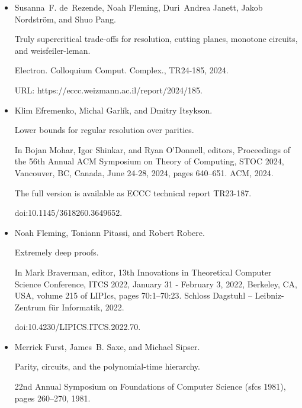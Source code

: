 \documentclass[10pt,a4paper]{article}
\begin{document}
\begin{itemize}
doi:10.2307/2273702.





\item 
[13]

Susanna F. de Rezende, Noah Fleming, Duri Andrea Janett, Jakob Nordström,
and Shuo Pang.


Truly supercritical trade-offs for resolution, cutting planes,
monotone circuits, and weisfeiler-leman.


Electron. Colloquium Comput. Complex., TR24-185, 2024.


URL: https://eccc.weizmann.ac.il/report/2024/185.





\item 
[14]

Klim Efremenko, Michal Garlík, and Dmitry Itsykson.


Lower bounds for regular resolution over parities.


In Bojan Mohar, Igor Shinkar, and Ryan O’Donnell, editors, Proceedings of the 56th Annual ACM Symposium on Theory of Computing, STOC
2024, Vancouver, BC, Canada, June 24-28, 2024, pages 640–651. ACM, 2024.


The full version is available as ECCC technical report TR23-187.


doi:10.1145/3618260.3649652.





\item 
[15]

Noah Fleming, Toniann Pitassi, and Robert Robere.


Extremely deep proofs.


In Mark Braverman, editor, 13th Innovations in Theoretical
Computer Science Conference, ITCS 2022, January 31 - February 3, 2022,
Berkeley, CA, USA, volume 215 of LIPIcs, pages 70:1–70:23. Schloss
Dagstuhl – Leibniz-Zentrum für Informatik, 2022.


doi:10.4230/LIPICS.ITCS.2022.70.





\item 
[16]

Merrick Furst, James B. Saxe, and Michael Sipser.


Parity, circuits, and the polynomial-time hierarchy.


22nd Annual Symposium on Foundations of Computer Science (sfcs
1981), pages 260–270, 1981.



\end{itemize}
\end{document}
